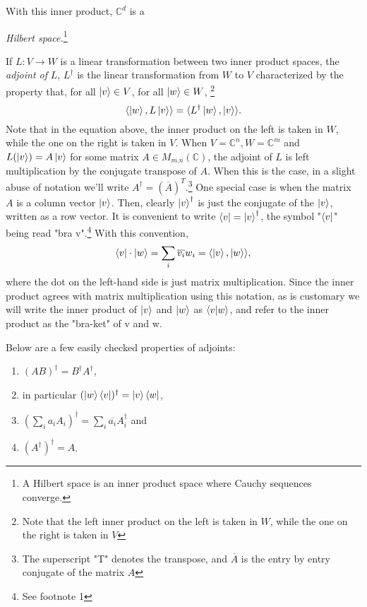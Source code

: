 With this inner product, ${\mathbb{C}}^d$ is a {\emph{Hilbert space.}\footnote{A Hilbert space is an inner product space where Cauchy sequences converge.}  

If $L:V \to W$ is a linear transformation between two inner product spaces, the {\emph{adjoint of }}$L$, $L^\dagger$ is the linear transformation from $W$ to $V$ characterized by the property that, \textrm{ for all } $\ket{v} \in V$, \textrm{ for all }$\ket{w} \in W$, \footnote{Note that the left inner product on the left is taken in $W$, while the one on the right is taken in $V$}
\begin{equation}
    \langle\ket{w}, L\ket{v}\rangle=\langle L^\dagger \ket{w}, \ket{v}\rangle .
\end{equation}
Note that in the equation above, the inner product on the left is taken in $W$, while the one on the right is taken in $V$.  When $V={\mathbb{C}}^n, W={\mathbb{C}}^m$ and $L(\ket{v})=A\ket{v}$ for some matrix $A \in M_{m.n}(\mathbb{C})$, the adjoint of $L$ is left multiplication by the conjugate transpose of $A$.  When this is the case, in a slight abuse of notation we'll write $A^\dagger=(\overline{A})^T$.\footnote{The superscript "T" denotes the transpose, and $\overline{A}$ is the entry by entry conjugate of the matrix $A$} One special case is when the matrix $A$ is a column vector $\ket{v}$.  Then, clearly $\ket{v}^\dagger$ is just the conjugate of the $\ket{v}$, written as a row vector.  It is convenient to write $\bra{v}={\ket{v}}^\dagger$, the symbol "$\bra{v}$" being read "bra v".\footnote{See footnote 1}  With this convention,
\begin{equation}
\bra{v}\cdot \ket{w}=\sum_i \overline{v_i}w_i=\langle \ket{v},\ket{w}\rangle,
\end{equation}
where the dot on the left-hand side is just matrix multiplication.  Since the inner product agrees with matrix multiplication using this notation, as is customary we will write the inner product of $\ket{v}$ and $\ket{w}$ as $\braket{v|w}$, and refer to the inner product as the "bra-ket" of v and w.

Below are a few easily checked properties of adjoints:
\begin{enumerate}
    \item $(AB)^\dagger=B^\dagger A^\dagger$,
    \item in particular $(\ket{w}\bra{v})^\dagger=\ket{v}\bra{w}$,
    \item $(\sum_i a_i A_i)^\dagger=\sum_i \overline{a_i} A_i^\dagger$ and 
    \item $(A^\dagger)^\dagger=A$.
\end{enumerate}

}
